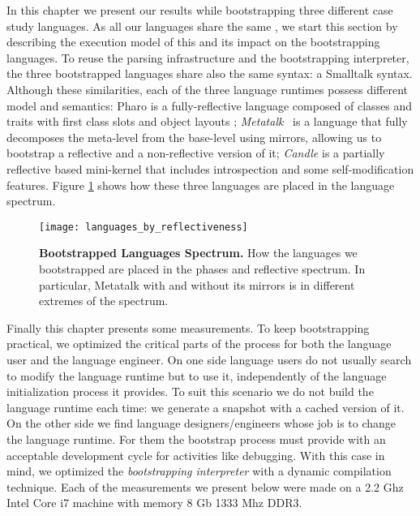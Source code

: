 In this chapter we present our results while bootstrapping three different case study languages.
As all our languages share the same \VM, we start this section by describing the execution model of this \VM and its impact on the bootstrapping languages.
To reuse the parsing infrastructure and the bootstrapping interpreter, the three bootstrapped languages share also the same syntax: a Smalltalk syntax. Although these similarities, each of the three language runtimes possess different model and semantics: Pharo is a fully-reflective language composed of classes and traits with first class slots and object layouts \cite{Verw11a}; \emph{Metatalk}~\cite{Papo11a} is a language that fully decomposes the meta-level from the base-level using mirrors, allowing us to bootstrap a reflective and a non-reflective version of it; \emph{Candle} is a partially reflective  based mini-kernel that includes introspection and some self-modification features. Figure \ref{fig:languages_spectrum} shows how these three languages are placed in the language spectrum.%

\begin{figure}[ht]
\center
\texttt{[image: languages\_by\_reflectiveness]}
\caption{\textbf{Bootstrapped Languages Spectrum.} How the languages we bootstrapped are placed in the phases and reflective spectrum. In particular, Metatalk with and without its mirrors is in different extremes of the spectrum.\label{fig:languages_spectrum}}
\end{figure}

Finally this chapter presents some measurements. To keep bootstrapping practical, we optimized the critical parts of the process for both the language user and the language engineer. On one side language users do not usually search to modify the language runtime but to use it, independently of the language initialization process it provides. To suit this scenario we do not build the language runtime each time: we generate a snapshot with a cached version of it. On the other side we find language designers/engineers whose job is to change the language runtime. For them the bootstrap process must provide with an acceptable development cycle for activities like debugging. With this case in mind, we optimized the \emph{bootstrapping interpreter} with a dynamic compilation technique. Each of the measurements we present below were made on a 2.2 Ghz Intel Core i7 machine with memory 8 Gb 1333 Mhz DDR3.

